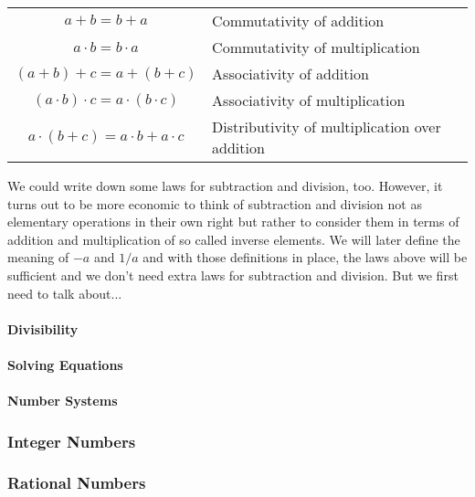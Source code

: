 \medskip
\begin{tabular}{c l}
  $a + b = b + a$                             & Commutativity of addition \\
  $a \cdot b = b \cdot a$                     & Commutativity of multiplication \\
  $(a + b) + c = a + (b + c)$                 & Associativity of addition \\
  $(a \cdot b) \cdot c = a \cdot (b \cdot c)$ & Associativity of multiplication \\
  $a \cdot (b + c) = a \cdot b + a \cdot c$   & Distributivity of multiplication over addition
\end{tabular}
\medskip

We could write down some laws for subtraction and division, too. However, it turns out to be more economic to think of subtraction and division not as elementary operations in their own right but rather to consider them in terms of addition and multiplication of so called inverse elements. We will later define the meaning of $-a$ and $1/a$ and with those definitions in place, the laws above will be sufficient and we don't need extra laws for subtraction and division. But we first need to talk about...

\paragraph{Divisibility}

\paragraph{Solving Equations}





\paragraph{Number Systems}


\subsubsection{Integer Numbers}


\subsubsection{Rational Numbers}


